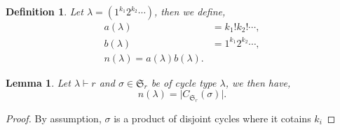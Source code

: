 \documentclass{article}
\newtheorem{definition}{Definition}[section]
\newtheorem{lemma}{Lemma}[section]
\numberwithin{equation}{theorem}
\newcommand{\fS}[0]{\mathfrak{S}}
\begin{document}
\begin{definition}
    Let $\lambda = (1^{k_1}2^{k_2}\cdots)$, then we define,
    \begin{align*}
        a(\lambda) & = k_1!k_2!\cdots,\\
        b(\lambda) & = 1^{k_1}2^{k_2}\cdots,\\
        n(\lambda) = a(\lambda)b(\lambda).
    \end{align*}
\end{definition}
\begin{lemma}
    Let $\lambda\vdash r$ and $\sigma\in\fS_r$ be of cycle type $\lambda$, we then have,
    \begin{equation*}
        n(\lambda) = \vert C_{\fS_r}(\sigma)\vert.
    \end{equation*}
\end{lemma}
\begin{proof}
    By assumption, $\sigma$ is a product of disjoint cycles where it cotains $k_i$ 
\end{proof}
\end{document}
